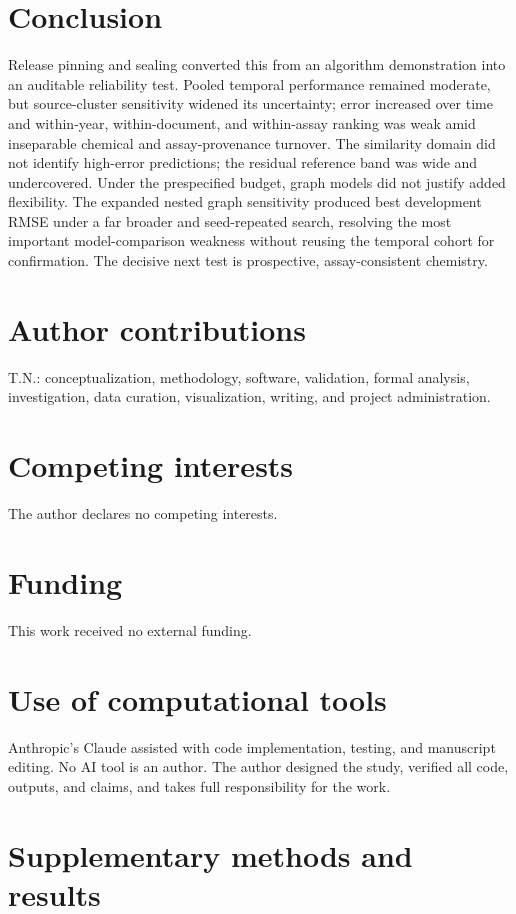 \documentclass[11pt]{article}
\begin{document}
\section{Conclusion}

Release pinning and sealing converted this from an algorithm demonstration into
an auditable reliability test. Pooled temporal performance remained moderate,
but source-cluster sensitivity widened its uncertainty; error increased over time
and within-year, within-document, and within-assay ranking was weak amid
inseparable chemical and assay-provenance turnover. The similarity domain did not identify
high-error predictions; the residual reference band was wide and undercovered.
Under the prespecified budget, graph models did not justify added flexibility.
The expanded nested graph sensitivity produced best development RMSE
\TunedGNNBestRMSE{} under a far broader and seed-repeated search, resolving the
most important model-comparison weakness without reusing the temporal cohort for
confirmation. The decisive next test is prospective, assay-consistent chemistry.

\section*{Author contributions}
T.N.: conceptualization, methodology, software, validation, formal analysis,
investigation, data curation, visualization, writing, and project administration.

\section*{Competing interests}
The author declares no competing interests.

\section*{Funding}
This work received no external funding.

\section*{Use of computational tools}
Anthropic's Claude assisted with code implementation, testing, and manuscript
editing. No AI tool is an author. The author designed the study, verified all
code, outputs, and claims, and takes full responsibility for the work.

\par\bigskip
\appendix
\section{Supplementary methods and results}
\end{document}
